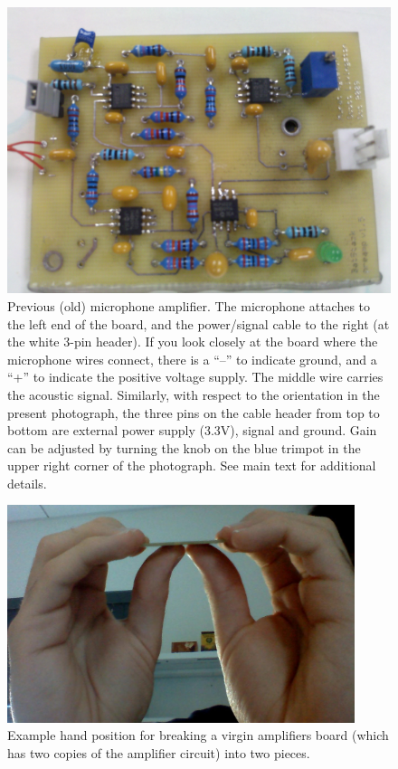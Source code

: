 \documentclass[letterpaper]{article}
\begin{document}
\begin{figure}
\centering
\includegraphics[width=5in]{figures/old_preamp_board.jpg}
\caption[Previous (old) microphone amplifier]{Previous (old)
  microphone amplifier. The microphone attaches to the left end of the
  board, and the power/signal cable to the right (at the white 3-pin
  header). If you look closely at the board where the microphone wires
  connect, there is a ``--'' to indicate ground, and a ``+'' to
  indicate the positive voltage supply. The middle wire carries the
  acoustic signal. Similarly, with respect to the orientation in the
  present photograph, the three pins on the cable header from top to
  bottom are external power supply (3.3V), signal and ground. Gain can
  be adjusted by turning the knob on the blue trimpot in the upper
  right corner of the photograph. See main text for additional
  details.}
\label{oldpreamp:fig}
\end{figure}

\begin{figure}
\centering
\includegraphics[width=4in]{figures/oldmicamp_board_break.jpg}
\caption[How to break virgin amplifier boards]{Example hand position
  for breaking a virgin amplifiers board (which has two copies of the
  amplifier circuit) into two pieces.}
\label{oldpreamp_break:fig}
\end{figure}
\end{document}
